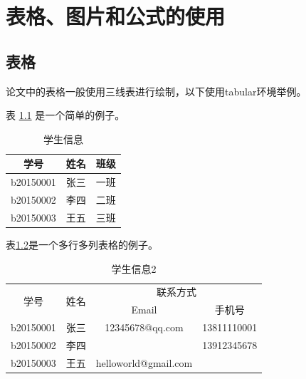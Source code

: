 
\chapter{表格、图片和公式的使用}
\section{表格}
论文中的表格一般使用三线表进行绘制，以下使用tabular环境举例。\par
表 \ref{student_info} 是一个简单的例子。 \par
\begin{table}
\label{student_info}
\begin{center}
\caption{学生信息}
\begin{tabular}{ccc}
    \toprule
    学号  &   姓名  &   班级\\
    \midrule
    b20150001   &   张三  &   一班\\
    b20150002   &   李四  &   二班\\
    b20150003   &   王五  &   三班\\
    \bottomrule
\end{tabular}
\end{center}
\end{table}

表\ref{student_info2}是一个多行多列表格的例子。 \par
\begin{table}
\caption{学生信息2}
\label{student_info2}
\begin{center}
\begin{tabular}{cccc}
    \hline
    \multirow{2}{*}{学号}  &  \multirow{2}{*}{姓名}  &   \multicolumn{2}{c}{联系方式}\\
        &   &   Email   &   手机号\\
    \hline
    b20150001   &   张三  &   12345678@qq.com &   13811110001\\
    b20150002   &   李四  &       &   13912345678\\
    b20150003   &   王五  &   helloworld@gmail.com    &   \\
    \hline
\end{tabular}
\end{center}
\end{table}


